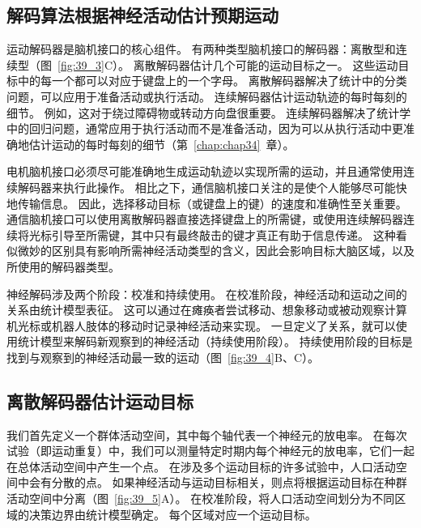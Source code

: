\subsection{解码算法根据神经活动估计预期运动}

运动解码器是脑机接口的核心组件。 
有两种类型脑机接口的解码器：离散型和连续型（图~\ref{fig:39_3}C）。
离散解码器估计几个可能的运动目标之一。
这些运动目标中的每一个都可以对应于键盘上的一个字母。
离散解码器解决了统计中的分类问题，可以应用于准备活动或执行活动。
连续解码器估计运动轨迹的每时每刻的细节。
例如，这对于绕过障碍物或转动方向盘很重要。
连续解码器解决了统计学中的回归问题，通常应用于执行活动而不是准备活动，因为可以从执行活动中更准确地估计运动的每时每刻的细节（第~\ref{chap:chap34}~章）。


电机脑机接口必须尽可能准确地生成运动轨迹以实现所需的运动，并且通常使用连续解码器来执行此操作。
相比之下，通信脑机接口关注的是使个人能够尽可能快地传输信息。
因此，选择移动目标（或键盘上的键）的速度和准确性至关重要。
通信脑机接口可以使用离散解码器直接选择键盘上的所需键，或使用连续解码器连续将光标引导至所需键，其中只有最终敲击的键才真正有助于信息传递。
这种看似微妙的区别具有影响所需神经活动类型的含义，因此会影响目标大脑区域，以及所使用的解码器类型。


神经解码涉及两个阶段：校准和持续使用。
在校准阶段，神经活动和运动之间的关系由统计模型表征。
这可以通过在瘫痪者尝试移动、想象移动或被动观察计算机光标或机器人肢体的移动时记录神经活动来实现。
一旦定义了关系，就可以使用统计模型来解码新观察到的神经活动（持续使用阶段）。
持续使用阶段的目标是找到与观察到的神经活动最一致的运动（图~\ref{fig:39_4}B、C）。



\subsection{离散解码器估计运动目标}

我们首先定义一个群体活动空间，其中每个轴代表一个神经元的放电率。
在每次试验（即运动重复）中，我们可以测量特定时期内每个神经元的放电率，它们一起在总体活动空间中产生一个点。
在涉及多个运动目标的许多试验中，人口活动空间中会有分散的点。
如果神经活动与运动目标相关，则点将根据运动目标在种群活动空间中分离（图~\ref{fig:39_5}A）。
在校准阶段，将人口活动空间划分为不同区域的决策边界由统计模型确定。
每个区域对应一个运动目标。


